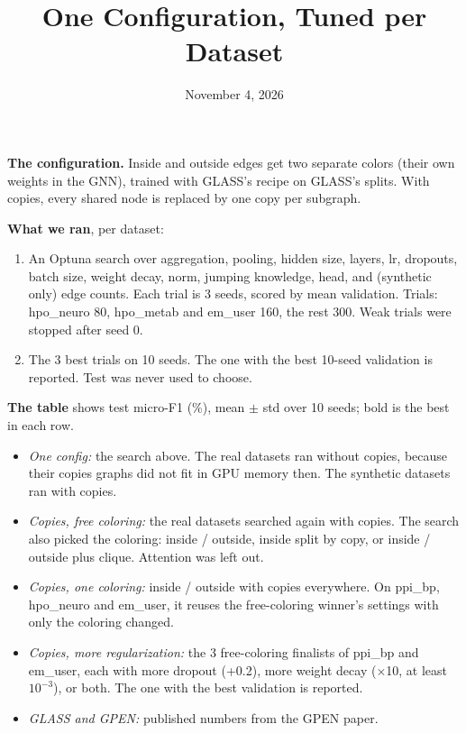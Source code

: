 \documentclass[11pt]{article}
\title{One Configuration, Tuned per Dataset}
\author{}
\date{November 4, 2026}
\begin{document}
\maketitle

\textbf{The configuration.} Inside and outside edges get two separate colors (their own weights
in the GNN), trained with GLASS's recipe on GLASS's splits. With copies, every shared node is
replaced by one copy per subgraph.

\textbf{What we ran}, per dataset:
\begin{enumerate}
  \item An Optuna search over aggregation, pooling, hidden size, layers, lr, dropouts, batch
        size, weight decay, norm, jumping knowledge, head, and (synthetic only) edge counts.
        Each trial is 3 seeds, scored by mean validation. Trials: hpo\_neuro 80, hpo\_metab and
        em\_user 160, the rest 300. Weak trials were stopped after seed 0.
  \item The 3 best trials on 10 seeds. The one with the best 10-seed validation is reported.
        Test was never used to choose.
\end{enumerate}

\textbf{The table} shows test micro-F1 (\%), mean $\pm$ std over 10 seeds; bold is the best in
each row.
\begin{itemize}
  \item \emph{One config:} the search above. The real datasets ran without copies, because their
        copies graphs did not fit in GPU memory then. The synthetic datasets ran with copies.
  \item \emph{Copies, free coloring:} the real datasets searched again with copies. The search
        also picked the coloring: inside / outside, inside split by copy, or inside / outside plus
        clique. Attention was left out.
  \item \emph{Copies, one coloring:} inside / outside with copies everywhere. On ppi\_bp,
        hpo\_neuro and em\_user, it reuses the free-coloring winner's settings with only the
        coloring changed.
  \item \emph{Copies, more regularization:} the 3 free-coloring finalists of ppi\_bp and em\_user,
        each with more dropout (+0.2), more weight decay ($\times$10, at least $10^{-3}$), or both.
        The one with the best validation is reported.
  \item \emph{GLASS and GPEN:} published numbers from the GPEN paper.
\end{itemize}
\end{document}
